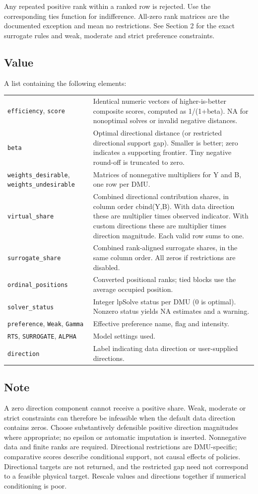 \documentclass[10pt,a4paper]{article}
\newcommand{\field}[1]{\needspace{3\baselineskip}\subsection*{#1}}
\begin{document}
Any repeated positive rank within a ranked row is rejected. Use the corresponding ties function for indifference. All-zero rank matrices are the documented exception and mean no restrictions.
See Section 2 for the exact surrogate rules and weak, moderate and strict preference constraints.
\field{Value}
A list containing the following elements:
\begin{longtable}{@{}p{53mm}p{106mm}@{}}
\texttt{efficiency}, \texttt{score} & Identical numeric vectors of higher-is-better composite scores, computed as 1/(1+beta). NA for nonoptimal solves or invalid negative distances. \\[2pt]
\texttt{beta} & Optimal directional distance (or restricted directional support gap). Smaller is better; zero indicates a supporting frontier. Tiny negative round-off is truncated to zero. \\[2pt]
\texttt{weights\_desirable}, \texttt{weights\_undesirable} & Matrices of nonnegative multipliers for Y and B, one row per DMU. \\[2pt]
\texttt{virtual\_share} & Combined directional contribution shares, in column order cbind(Y,B). With data direction these are multiplier times observed indicator. With custom directions these are multiplier times direction magnitude. Each valid row sums to one. \\[2pt]
\texttt{surrogate\_share} & Combined rank-aligned surrogate shares, in the same column order. All zeros if restrictions are disabled. \\[2pt]
\texttt{ordinal\_positions} & Converted positional ranks; tied blocks use the average occupied position. \\[2pt]
\texttt{solver\_status} & Integer lpSolve status per DMU (0 is optimal). Nonzero status yields NA estimates and a warning. \\[2pt]
\texttt{preference}, \texttt{Weak}, \texttt{Gamma} & Effective preference name, flag and intensity. \\[2pt]
\texttt{RTS}, \texttt{SURROGATE}, \texttt{ALPHA} & Model settings used. \\[2pt]
\texttt{direction} & Label indicating data direction or user-supplied directions. \\[2pt]
\end{longtable}
\field{Note}
A zero direction component cannot receive a positive share. Weak, moderate or strict constraints can therefore be infeasible when the default data direction contains zeros. Choose substantively defensible positive direction magnitudes where appropriate; no epsilon or automatic imputation is inserted. Nonnegative data and finite ranks are required. Directional restrictions are DMU-specific; comparative scores describe conditional support, not causal effects of policies. Directional targets are not returned, and the restricted gap need not correspond to a feasible physical target. Rescale values and directions together if numerical conditioning is poor.
\end{document}
